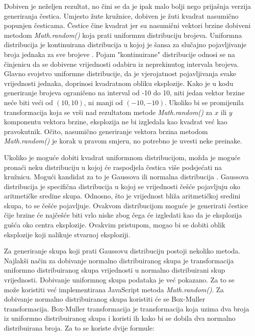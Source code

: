 \documentclass{foi}
\begin{document}
Dobiven je neželjen rezultat, no čini se da je ipak malo bolji nego prijašnja verzija generiranja čestica. Umjesto žute kružnice, dobiven je žuti kvadrat nasumično popunjen česticama. Čestice čine kvadrat jer su nasumični vektori brzine dobiveni metodom \textit{Math.random()} koja prati uniformnu distribuciju brojeva. Uniformna distribucija je kontinuirana distribucija u kojoj je šansa za slučajno pojavljivanje broja jednaka za sve brojeve \parencite{LibreTextsUniform2024}. Pojam "kontinuirane" distribucije odnosi se na činjenicu da se dobivene vrijednosti odabiru iz neprekinutog intervala brojeva. Glavno svojstvo uniformne distribucije, da je vjerojatnost pojavljivanja svake vrijednosti jednaka, doprinosi kvadratnom obliku eksplozije. Kako je u kodu generiranje brojeva ograničeno na interval od -10 do 10, niti jedan vektor brzine neće biti veći od $(10,10)$, ni manji od $(-10,-10)$. Ukoliko bi se promijenila transformacija koja se vrši nad rezultatom metode \textit{Math.random()} za $x$ ili $y$ komponentu vektora brzine, eksplozija ne bi izgledala kao kvadrat već kao pravokutnik. Očito, nasumično generiranje vektora brzina metodom \textit{Math.random()} je korak u pravom smjeru, no potrebno je uvesti neke preinake. 

Ukoliko je moguće dobiti kvadrat uniformnom distribucijom, možda je moguće pronaći neku distribuciju u kojoj će raspodjela čestica više podsjećati na kružnicu. Mogući kandidat za to je Gaussova ili normalna distribucija \parencite{DeepAIGaussian2024}. Gaussova distribucija je specifična distribucija u kojoj se vrijednosti češće pojavljuju oko aritmetičke sredine skupa. Odnosno, što je vrijednost bliža aritmetičkoj sredini skupa, to se češće pojavljuje. Ovakvom distribucijom moguće je generirati čestice čije brzine će najčešće biti vrlo niske zbog čega će izgledati kao da je eksplozija gušća oko centra eksplozije. Ovakvim pristupom, mogao bi se dobiti oblik eksplozije koji nalikuje stvarnoj eksploziji.

Za generiranje skupa koji prati Gaussovu distribuciju postoji nekoliko metoda. Najlakši način za dobivanje normalno distribuiranog skupa je transformacija uniformno distribuiranog skupa vrijednosti u normalno distribuirani skup vrijednosti. Dobivanje uniformnog skupa podataka je već pokazano. Za to se može koristiti već implementirana JavaScript metoda \textit{Math.random()}. Za dobivanje normalno distribuiranog skupa koristiti će se Box-Muller transformacija. Box-Muller transformacija je transformacija koja uzima dva broja iz uniformno distribuiranog skupa i koristi ih kako bi se dobila dva normalno distribuirana broja. Za to se koriste dvije formule:
\end{document}

